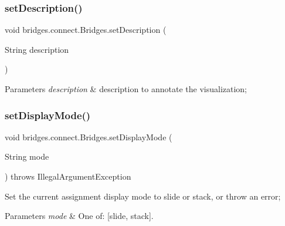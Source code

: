 \mbox{\label{classbridges_1_1connect_1_1_bridges_a50d1d5aa64d312393b63d1be854e34a2}} 
\subsubsection{\texorpdfstring{setDescription()}{setDescription()}}
{\footnotesize\ttfamily void bridges.\+connect.\+Bridges.\+set\+Description (\begin{DoxyParamCaption}\item[{String}]{description }\end{DoxyParamCaption})}


\begin{DoxyParams}{Parameters}
{\em description} & description to annotate the visualization; \\
\hline
\end{DoxyParams}
\mbox{\label{classbridges_1_1connect_1_1_bridges_aaa1a44a689daa26a841d0e8d31839861}} 
\subsubsection{\texorpdfstring{setDisplayMode()}{setDisplayMode()}}
{\footnotesize\ttfamily void bridges.\+connect.\+Bridges.\+set\+Display\+Mode (\begin{DoxyParamCaption}\item[{String}]{mode }\end{DoxyParamCaption}) throws Illegal\+Argument\+Exception}

Set the current assignment display mode to slide or stack, or throw an error; 
\begin{DoxyParams}{Parameters}
{\em mode} & One of\+: \mbox{[}\textquotesingle{}slide\textquotesingle{}, \textquotesingle{}stack\textquotesingle{}\mbox{]}. \\
\hline
\end{DoxyParams}
\mbox{\label{classbridges_1_1connect_1_1_bridges_ab69e89ec7d2e674a8b8c4b0be0c63397}} 
